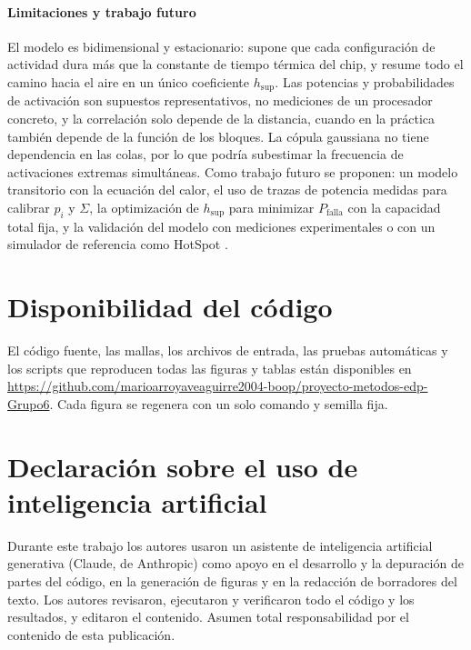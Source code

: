 \documentclass[preprint,11pt,sort&compress]{elsarticle}
\newcommand{\Pf}{P_{\mathrm{falla}}}
\newcommand{\hs}{h_{\mathrm{sup}}}
\begin{document}
\paragraph{Limitaciones y trabajo futuro} El modelo es bidimensional y estacionario: supone
que cada configuración de actividad dura más que la constante de tiempo térmica del chip,
y resume todo el camino hacia el aire en un único coeficiente $\hs$. Las potencias y
probabilidades de activación son supuestos representativos, no mediciones de un procesador
concreto, y la correlación solo depende de la distancia, cuando en la práctica también
depende de la función de los bloques. La cópula gaussiana no tiene dependencia en las
colas, por lo que podría subestimar la frecuencia de activaciones extremas simultáneas.
Como trabajo futuro se proponen: un modelo transitorio con la ecuación del calor, el uso de
trazas de potencia medidas para calibrar $p_i$ y $\Sigma$, la optimización de $\hs$ para
minimizar $\Pf$ con la capacidad total fija, y la validación del modelo con mediciones
experimentales o con un simulador de referencia como HotSpot \cite{huang2006hotspot}.

\section*{Disponibilidad del código}
\label{sec:codigo}
El código fuente, las mallas, los archivos de entrada, las pruebas automáticas y los
scripts que reproducen todas las figuras y tablas están disponibles en
\url{https://github.com/marioarroyaveaguirre2004-boop/proyecto-metodos-edp-Grupo6}. Cada figura se regenera con un solo comando y
semilla fija.

\section*{Declaración sobre el uso de inteligencia artificial}
Durante este trabajo los autores usaron un asistente de inteligencia artificial generativa
(Claude, de Anthropic) como apoyo en el desarrollo y la depuración de partes del código, en
la generación de figuras y en la redacción de borradores del texto. Los autores revisaron,
ejecutaron y verificaron todo el código y los resultados, y editaron el contenido. Asumen
total responsabilidad por el contenido de esta publicación.



\end{document}
